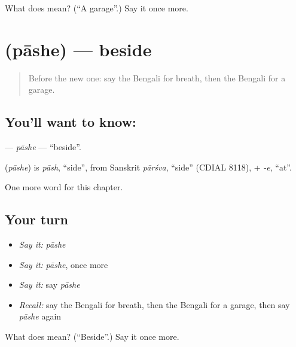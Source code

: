 \begin{tcolorbox}[breakable,colback=teal!4,colframe=teal!35!black,title={Before you move on}]
What does  mean? (\textquotedblleft{}A garage\textquotedblright{}.) Say it once more.
\end{tcolorbox}
\section[\texorpdfstring{\bn{পাশে} (pāshe)}{পাশে (pāshe)}]{ (pāshe) — beside}

\label{lesson:BN-C216-pashe}



\begin{quote}
Before the new one: say the Bengali for breath, then the Bengali for a garage.
\end{quote}

\subsection*{You'll want to know: }
\textbf{} — \emph{pāshe} — \textquotedblleft{}beside\textquotedblright{}.

\begin{cousinweb}
\textbf{} (\emph{pāshe}) is \emph{pāsh}, \textquotedblleft{}side\textquotedblright{}, from Sanskrit \emph{pārśva}, \textquotedblleft{}side\textquotedblright{} (CDIAL 8118), + \emph{-e}, \textquotedblleft{}at\textquotedblright{}.
\end{cousinweb}

\begin{grammarlens}[title={What you've built}]
One more word for this chapter.
\end{grammarlens}

\subsection*{Your turn}
\begin{itemize}
\raggedright
  \item \emph{Say it:} \emph{pāshe}
  \item \emph{Say it:} \emph{pāshe}, once more
  \item \emph{Say it:} say \emph{pāshe}
  \item \emph{Recall:} say the Bengali for breath, then the Bengali for a garage, then say \emph{pāshe} again
\end{itemize}

\begin{tcolorbox}[breakable,colback=teal!4,colframe=teal!35!black,title={Before you move on}]
What does  mean? (\textquotedblleft{}Beside\textquotedblright{}.) Say it once more.
\end{tcolorbox}
